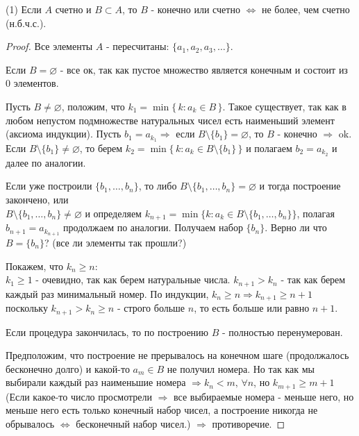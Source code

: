 \documentclass[12pt]{article}
\theoremstyle{definition}
\begin{document}
(1) Если $A$ счетно и $B \subset A$, то $B$ - конечно или счетно $\Leftrightarrow$ не более, чем счетно (н.б.ч.с.).
\begin{proof}
	Все элементы $A$ - пересчитаны: $\{a_1, a_2, a_3, \dotsc\}$.
	
	Если $B = \varnothing$ - все ок, так как пустое множество является конечным и состоит из 0 элементов.
	
	Пусть  $B \neq \varnothing$, положим, что $k_1 = \min\{\, k\colon a_k \in B\,\}$. Такое существует, так как в любом непустом подмножестве натуральных чисел есть наименьший элемент (аксиома индукции). Пусть $b_1 = a_{k_1} \Rightarrow$ если $B \setminus \{b_1\} = \varnothing$, то $B$ - конечно $\Rightarrow$ ok.\\ 
	Если $B \setminus \{b_1\} \neq \varnothing$, то берем $k_2 = \min\big\{\,k\colon a_k \in B \setminus \{b_1\}\,\big\}$ и полагаем $b_2 = a_{k_2}$ и далее по аналогии.
	
	Если уже построили $\{b_1, \dotsc , b_n\}$, то либо $B \setminus \{b_1, \dotsc, b_n\} = \varnothing$ и тогда построение закончено, или\\ 
	$B \setminus \{b_1, \dotsc , b_n\} \neq \varnothing$ и определяем $k_{n+1} = \min\big\{k\colon a_k \in B \setminus \{b_1, \dotsc , b_n\}\big\}$, полагая $b_{n+1} = a_{k_{n+1}}$ продолжаем по аналогии. Получаем набор $\{b_n\}$. Верно ли что $B = \{b_n\}$? (все ли элементы так прошли?)
	
	Покажем, что $k_n \geq n$: \\
	$k_1 \geq 1$ - очевидно, так как берем натуральные числа. $k_{n+1} > k_n$ - так как берем каждый раз минимальный номер. По индукции, $k_n \geq n \Rightarrow k_{n+1} \geq n+1$ поскольку $k_{n+1} > k_n \geq n$ - строго больше $n$, то есть больше или равно $n+1$.
	
	Если процедура закончилась, то по построению $B$ - полностью перенумерован.
	
	Предположим, что построение не прерывалось на конечном шаге (продолжалось бесконечно долго) и какой-то $a_m \in B$ не получил номера. Но так как мы выбирали каждый раз наименьшие номера $\Rightarrow k_n < m, \, \forall n$, но $k_{m+1} \geq m + 1$ (Если какое-то число просмотрели $\Rightarrow$ все выбираемые номера - меньше него, но меньше него есть только конечный набор чисел, а построение никогда не обрывалось $\Leftrightarrow$ бесконечный набор чисел.) $\Rightarrow$ противоречие.
\end{proof}
\end{document}

